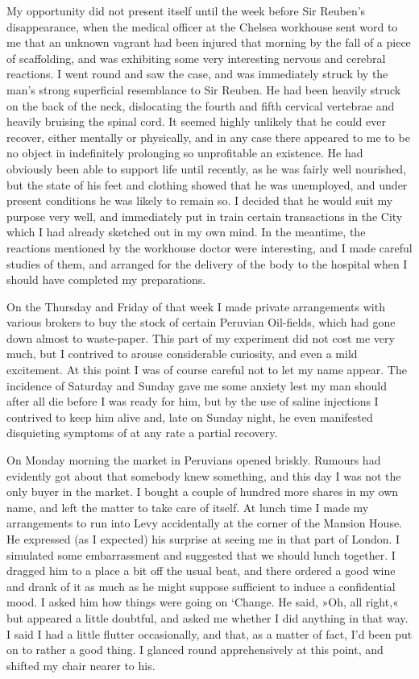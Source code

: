 My opportunity did not present itself until the week before Sir Reuben's disappearance, when the medical officer at the Chelsea workhouse sent word to me that an unknown vagrant had been injured that morning by the fall of a piece of scaffolding, and was exhibiting some very interesting nervous and cerebral reactions. I went round and saw the case, and was immediately struck by the man's strong superficial resemblance to Sir Reuben. He had been heavily struck on the back of the neck, dislocating the fourth and fifth cervical vertebrae and heavily bruising the spinal cord. It seemed highly unlikely that he could ever recover, either mentally or physically, and in any case there appeared to me to be no object in indefinitely prolonging so unprofitable an existence. He had obviously been able to support life until recently, as he was fairly well nourished, but the state of his feet and clothing showed that he was unemployed, and under present conditions he was likely to remain so. I decided that he would suit my purpose very well, and immediately put in train certain transactions in the City which I had already sketched out in my own mind. In the meantime, the reactions mentioned by the workhouse doctor were interesting, and I made careful studies of them, and arranged for the delivery of the body to the hospital when I should have completed my preparations.

On the Thursday and Friday of that week I made private arrangements with various brokers to buy the stock of certain Peruvian Oil-fields, which had gone down almost to waste-paper. This part of my experiment did not cost me very much, but I contrived to arouse considerable curiosity, and even a mild excitement. At this point I was of course careful not to let my name appear. The incidence of Saturday and Sunday gave me some anxiety lest my man should after all die before I was ready for him, but by the use of saline injections I contrived to keep him alive and, late on Sunday night, he even manifested disquieting symptoms of at any rate a partial recovery.

On Monday morning the market in Peruvians opened briskly. Rumours had evidently got about that somebody knew something, and this day I was not the only buyer in the market. I bought a couple of hundred more shares in my own name, and left the matter to take care of itself. At lunch time I made my arrangements to run into Levy accidentally at the corner of the Mansion House. He expressed (as I expected) his surprise at seeing me in that part of London. I simulated some embarrassment and suggested that we should lunch together. I dragged him to a place a bit off the usual beat, and there ordered a good wine and drank of it as much as he might suppose sufficient to induce a confidential mood. I asked him how things were going on `Change. He said, »Oh, all right,« but appeared a little doubtful, and asked me whether I did anything in that way. I said I had a little flutter occasionally, and that, as a matter of fact, I'd been put on to rather a good thing. I glanced round apprehensively at this point, and shifted my chair nearer to his.

